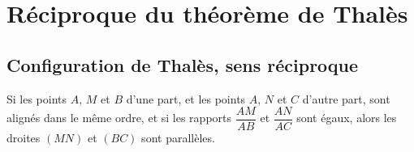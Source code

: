 \section{Réciproque du théorème de Thalès}


\subsection{Configuration de Thalès, sens réciproque}

\begin{propriete}
   Si les points $A$, $M$ et $B$ d'une part, et les points $A$, $N$ et $C$ d'autre part, sont alignés dans le même ordre, et si les rapports $\dfrac{AM}{AB}$ et $\dfrac{AN}{AC}$ sont égaux, alors les droites $(MN)$ et $(BC)$ sont parallèles.
\end{propriete}

